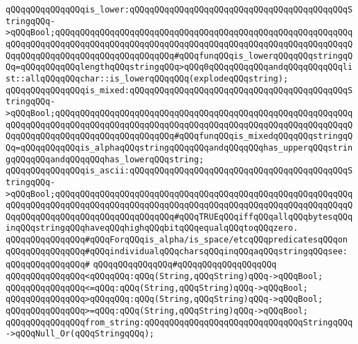 \verb|qQQqqQQqqQQqqQQqis_lower:qQQqqQQqqQQqqQQqqQQqqQQqqQQqqQQqqQQqqQQqqQQqStringqQQq->qQQqBool;qQQqqQQqqQQqqQQqqQQqqQQqqQQqqQQqqQQqqQQqqQQqqQQqqQQqqQQqqQQqqQQqqQQqqQQqqQQqqQQqqQQqqQQqqQQqqQQqqQQqqQQqqQQqqQQqqQQqqQQqqQQqqQQqqQQqqQQqqQQqqQQqqQQqqQQqqQQqqQQqqQQq#qQQqfunqQQqis_lowerqQQqqQQqstringqQQq=qQQqqQQqqQQqlengthqQQqstringqQQq>qQQq0qQQqqQQqqQQqandqQQqqQQqqQQqlist::allqQQqqQQqchar::is_lowerqQQqqQQq(explodeqQQqstring);|\newline
\verb|qQQqqQQqqQQqqQQqis_mixed:qQQqqQQqqQQqqQQqqQQqqQQqqQQqqQQqqQQqqQQqqQQqStringqQQq->qQQqBool;qQQqqQQqqQQqqQQqqQQqqQQqqQQqqQQqqQQqqQQqqQQqqQQqqQQqqQQqqQQqqQQqqQQqqQQqqQQqqQQqqQQqqQQqqQQqqQQqqQQqqQQqqQQqqQQqqQQqqQQqqQQqqQQqqQQqqQQqqQQqqQQqqQQqqQQqqQQqqQQqqQQq#qQQqfunqQQqis_mixedqQQqqQQqstringqQQq=qQQqqQQqqQQqis_alphaqQQqstringqQQqqQQqandqQQqqQQqhas_upperqQQqstringqQQqqQQqandqQQqqQQqhas_lowerqQQqstring;|\newline
\verb|qQQqqQQqqQQqqQQqis_ascii:qQQqqQQqqQQqqQQqqQQqqQQqqQQqqQQqqQQqqQQqqQQqStringqQQq->qQQqBool;qQQqqQQqqQQqqQQqqQQqqQQqqQQqqQQqqQQqqQQqqQQqqQQqqQQqqQQqqQQqqQQqqQQqqQQqqQQqqQQqqQQqqQQqqQQqqQQqqQQqqQQqqQQqqQQqqQQqqQQqqQQqqQQqqQQqqQQqqQQqqQQqqQQqqQQqqQQqqQQqqQQq#qQQqTRUEqQQqiffqQQqallqQQqbytesqQQqinqQQqstringqQQqhaveqQQqhighqQQqbitqQQqequalqQQqtoqQQqzero.|\newline
\newline
\verb|qQQqqQQqqQQqqQQq#qQQqForqQQqis_alpha/is_space/etcqQQqpredicatesqQQqon|\newline
\verb|qQQqqQQqqQQqqQQq#qQQqindividualqQQqcharsqQQqinqQQqaqQQqstringqQQqsee:|\newline
\verb|qQQqqQQqqQQqqQQq#|\newline
\verb|qQQqqQQqqQQqqQQq#qQQqqQQqqQQqqQQqqQQq|\newline
\newline
\verb|qQQqqQQqqQQqqQQq<qQQqqQQq:qQQq(String,qQQqString)qQQq->qQQqBool;|\newline
\verb|qQQqqQQqqQQqqQQq<=qQQq:qQQq(String,qQQqString)qQQq->qQQqBool;|\newline
\verb|qQQqqQQqqQQqqQQq>qQQqqQQq:qQQq(String,qQQqString)qQQq->qQQqBool;|\newline
\verb|qQQqqQQqqQQqqQQq>=qQQq:qQQq(String,qQQqString)qQQq->qQQqBool;|\newline
\newline
\verb|qQQqqQQqqQQqqQQqfrom_string:qQQqqQQqqQQqqQQqqQQqqQQqqQQqqQQqStringqQQq->qQQqNull_Or(qQQqStringqQQq);|\newline
